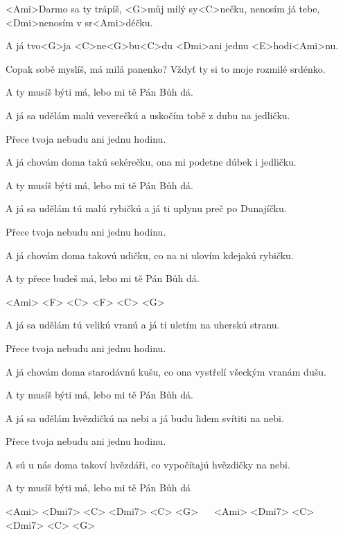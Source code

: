 

\zs
<Ami>Darmo sa ty trápíš, <G>můj milý sy<C>nečku, nenosím já tebe, <Dmi>nenosím v sr<Ami>déčku.

A já tvo<G>ja <C>ne<G>bu<C>du <Dmi>ani jednu <E>hodi<Ami>nu.
\ks

\zs
Copak sobě myslíš, má milá panenko? Vždyť ty si to moje rozmilé srdénko.

A ty musíš býti má, lebo mi tě Pán Bůh dá.
\ks

\zs
A já sa udělám malú veverečkú a uskočím tobě z dubu na jedličku.

Přece tvoja nebudu ani jednu hodinu.
\ks

\zs
A já chovám doma takú sekérečku, ona mi podetne dúbek i jedličku.

A ty musíš býti má, lebo mi tě Pán Bůh dá.
\ks

\zs
A já sa udělám tú malú rybičkú a já ti uplynu preč po Dunajíčku.

Přece tvoja nebudu ani jednu hodinu.
\ks

\zs
A já chovám doma takovú udičku, co na ni ulovím kdejakú rybičku.

A ty přece budeš má, lebo mi tě Pán Bůh dá.
\ks

\zr
<Ami> <F> <C> <F> <C> <G>
\kr

\zs
A já sa udělám tú velikú vranú a já ti uletím na uherskú stranu.

Přece tvoja nebudu ani jednu hodinu.
\ks

\zs
A já chovám doma starodávnú kušu, co ona vystřelí všeckým vranám dušu.

A ty musíš býti má, lebo mi tě Pán Bůh dá.
\ks

\zs
A já sa udělám hvězdičkú na nebi a já budu lidem svítiti na nebi.

Přece tvoja nebudu ani jednu hodinu.
\ks

\zs
A sú u nás doma takoví hvězdáři, co vypočítajú hvězdičky na nebi.

A ty musíš býti má, lebo mi tě Pán Bůh dá
\ks

\zr
<Ami> <Dmi7> <C> <Dmi7> <C> <G> ~~
<Ami> <Dmi7> <C> <Dmi7> <C> <G>
\kr

\kp







